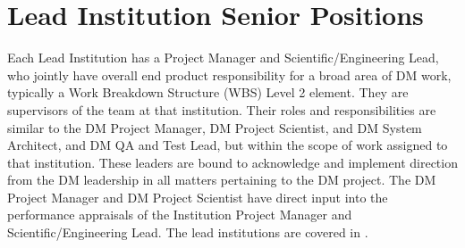 \section{Lead Institution Senior Positions}
Each Lead Institution has a Project Manager and Scientific/Engineering Lead, who jointly have overall end product responsibility for a broad area of DM work, typically a Work Breakdown Structure (WBS) Level 2 element. They are supervisors of the team at that institution.  Their roles and responsibilities are similar to the DM Project Manager, DM Project Scientist, and DM System Architect, and DM QA and Test Lead, but within the scope of work assigned to that institution.  These leaders are bound to acknowledge and implement direction from the DM leadership in all matters pertaining to the DM project.  The DM Project Manager and DM Project Scientist have direct input into the performance appraisals of the Institution Project Manager and Scientific/Engineering Lead. 
The lead institutions are covered  in .

